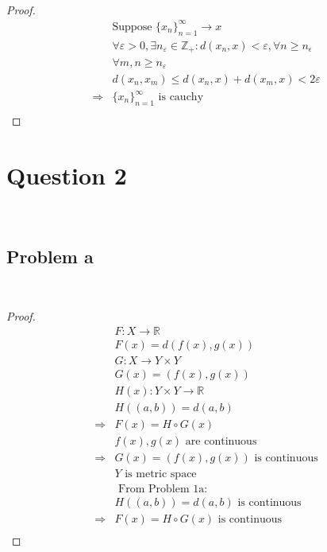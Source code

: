 \documentclass{article}
\begin{document}
~

\begin{proof}
    \begin{align*}
        &\text{Suppose }\{x_n\}_{n=1}^\infty\rightarrow x\\
        &\forall \varepsilon>0,\exists n_\varepsilon \in \mathbb{Z} _+:d(x_n,x)<\varepsilon,\forall n\geqslant n_\epsilon\\
        &\forall m,n\geqslant n_\varepsilon\\
        &d(x_n,x_m)\leqslant d(x_n,x)+d(x_m,x)<2\varepsilon \\
        \Rightarrow&\{x_n\}_{n=1}^\infty\text{ is cauchy}\\
    \end{align*}
\end{proof}

\newpage

\section*{Question 2}

~

\subsection*{Problem a}

~

\begin{proof}
    \begin{align*}
        &F:X\rightarrow \mathbb{R} \\
        &F(x)=d(f(x),g(x))\\
        &G:X\rightarrow Y\times Y\\
        &G(x)=(f(x),g(x))\\
        &H(x):Y\times Y\rightarrow \mathbb{R} \\
        &H((a,b))=d(a,b)\\
        \Rightarrow&F(x)=H\circ G(x)\\
        &f(x),g(x)\text{ are continuous}\\
        \Rightarrow&G(x)=(f(x),g(x))\text{ is continuous}\\
        &Y\text{ is metric space}\\
        &\text{ From Problem 1a}:\\
        &H((a,b))=d(a,b)\text{ is continuous}\\
        \Rightarrow&F(x)=H\circ G(x)\text{ is continuous}\\
    \end{align*}
\end{proof}
\end{document}
